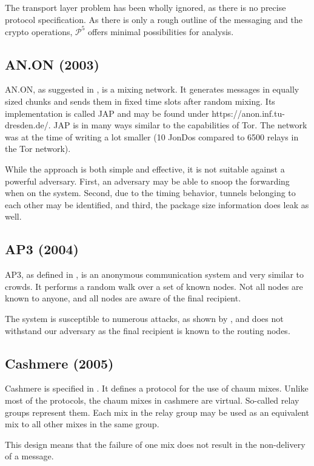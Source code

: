 The transport layer problem has been wholly ignored, as there is no precise protocol specification. As there is only a rough outline of the messaging and the crypto operations, $\mathcal{P}^5$ offers minimal possibilities for analysis.

\subsection{AN.ON (2003)}
AN.ON, as suggested in \cite{federrath2003system}, is a mixing network. It generates messages in equally sized chunks and sends them in fixed time slots after random mixing. Its implementation is called JAP and may be found under https://anon.inf.tu-dresden.de/. JAP is in many ways similar to the capabilities of Tor. The network was at the time of writing a lot smaller (10 JonDos compared to 6500 relays in the Tor network).

While the approach is both simple and effective, it is not suitable against a powerful adversary. First, an adversary may be able to snoop the forwarding when on the system. Second, due to the timing behavior, tunnels belonging to each other may be identified, and third, the package size information does leak as well.

\subsection{AP3 (2004)}
AP3, as defined in \cite{mislove2004ap3}, is an anonymous communication system and very similar to crowds. It performs a random walk over a set of known nodes. Not all nodes are known to anyone, and all nodes are aware of the final recipient. 

The system is susceptible to numerous attacks, as shown by \cite{ccs2008:mittal}, and does not withstand our adversary as the final recipient is known to the routing nodes. 

\subsection{Cashmere (2005)}
Cashmere is specified in \cite{zhuang2005cashmere}. It defines a protocol for the use of chaum mixes. Unlike most of the protocols, the chaum mixes in cashmere are virtual. So-called relay groups represent them. Each mix in the relay group may be used as an equivalent mix to all other mixes in the same group. 

This design means that the failure of one mix does not result in the non-delivery of a message.

